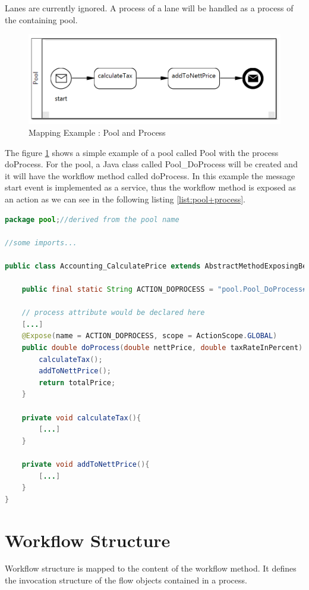Lanes are currently ignored. A process of a lane will be handled as a process of the containing pool.

\begin{figure}[h]
	\centering
		\includegraphics[width=1.0\textwidth]{images/mapping/pool_and_process.png}
	\caption{Mapping Example : Pool and Process}
	\label{fig:pool+process}
\end{figure}

The figure \ref{fig:pool+process} shows a simple example of a pool called Pool with the process doProcess. For the pool, a Java class called Pool\_DoProcess will be created and it will have the workflow method called doProcess. In this example the message start event is implemented as a service, thus the workflow method is exposed as an action as we can see in the following listing \ref{list:pool+process}.  
\begin{lstlisting}[language = Java, caption =  Mapped Element: Pool and Process (Figure \ref{fig:pool+process}), label = list:pool+process]
package pool;//derived from the pool name

//some imports...

public class Accounting_CalculatePrice extends AbstractMethodExposingBean{
	
	public final static String ACTION_DOPROCESS = "pool.Pool_DoProcess#doProcess"; 
	
	// process attribute would be declared here
	[...]
	@Expose(name = ACTION_DOPROCESS, scope = ActionScope.GLOBAL)
	public double doProcess(double nettPrice, double taxRateInPercent) {
		calculateTax();
		addToNettPrice();
		return totalPrice;
	}
	
	private void calculateTax(){
		[...]
	}
	
	private void addToNettPrice(){
		[...]
	}
}
\end{lstlisting}
\section{Workflow Structure}
Workflow structure is mapped to the content of the workflow method. It defines the invocation structure of the flow objects contained in a process.

